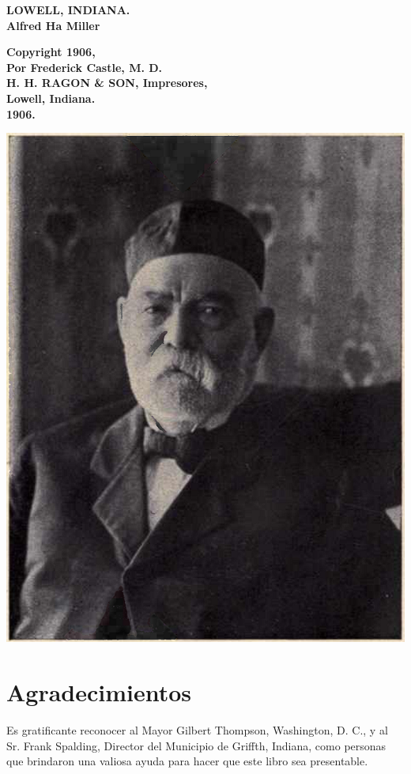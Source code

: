 \documentclass[12pt]{book}
\begin{document}
\begin{center}
\textbf{LOWELL, INDIANA.\\
Alfred Ha Miller}

\textbf{Copyright 1906,\\
Por Frederick Castle, M. D.\\
H. H. RAGON \& SON, Impresores,\\
Lowell, Indiana.\\
1906.}
\end{center}

\begin{center}
\includegraphics[width=1\textwidth]{./img/foto.png} %
\end{center}

\chapter*{Agradecimientos}

Es gratificante reconocer al Mayor Gilbert Thompson, Washington, D. C., y al Sr. Frank Spalding, Director del Municipio de Griffth, Indiana, como personas que brindaron una valiosa ayuda para hacer que este libro sea presentable.
\end{document}

